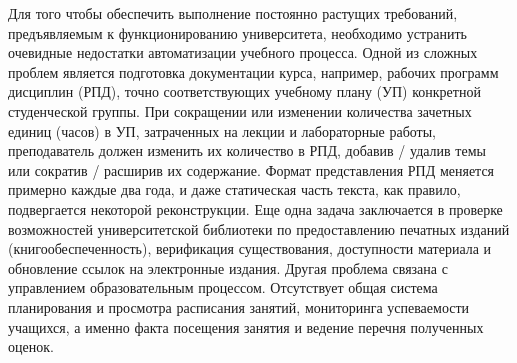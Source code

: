 \documentclass[
]{aiitart}
\begin{document}
Для того чтобы обеспечить выполнение постоянно растущих требований, предъявляемым к функционированию университета, необходимо устранить очевидные недостатки автоматизации учебного процесса. Одной из сложных проблем является подготовка документации курса, например, рабочих программ дисциплин (РПД), точно соответствующих учебному плану (УП) конкретной студенческой группы. При сокращении или изменении количества зачетных единиц (часов) в УП, затраченных на лекции и лабораторные работы, преподаватель должен изменить их количество в РПД, добавив / удалив темы или сократив / расширив их содержание. Формат представления РПД меняется примерно каждые два года, и даже статическая часть текста, как правило, подвергается некоторой реконструкции. Еще одна задача заключается в проверке возможностей университетской библиотеки по предоставлению печатных изданий (книгообеспеченность), верификация существования, доступности материала и обновление ссылок на электронные издания. Другая проблема связана с управлением образовательным процессом. Отсутствует общая система планирования и просмотра расписания занятий, мониторинга успеваемости учащихся, а именно факта посещения занятия и ведение перечня полученных оценок.

\end{document}
